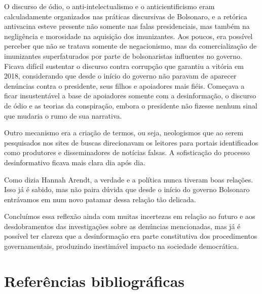 O discurso de ódio, o anti-intelectualismo e o anticientificismo eram
calculadamente organizados nas práticas discursivas de Bolsonaro, e a
retórica antivacina esteve presente não somente nas falas presidenciais,
mas também na negligência e morosidade na aquisição dos imunizantes. Aos
poucos, era possível perceber que não se tratava somente de
negacionismo, mas da comercialização de imunizantes superfaturados por
parte de bolsonaristas influentes no governo. Ficava difícil sustentar o
discurso contra corrupção que garantiu a vitória em 2018, considerando
que desde o início do governo não paravam de aparecer denúncias contra o
presidente, seus filhos e apoiadores mais fiéis. Começava a ficar
insustentável a base de apoiadores somente com a desinformação, o
discurso de ódio e as teorias da conspiração, embora o presidente não
fizesse nenhum sinal que mudaria o rumo de sua narrativa.

Outro mecanismo era a criação de termos, ou seja, neologismos que ao
serem pesquisados nos sites de buscas direcionavam os leitores para
portais identificados como produtores e disseminadores de notícias
falsas. A sofisticação do processo desinformativo ficava mais clara dia
após dia.

Como dizia Hannah Arendt, a verdade e a política nunca tiveram boas
relações. Isso já é sabido, mas não paira dúvida que desde o início do
governo Bolsonaro entrávamos em num novo patamar dessa relação tão
delicada.

Concluímos essa reflexão ainda com muitas incertezas em relação ao
futuro e aos desdobramentos das investigações sobre as denúncias
mencionadas, mas já é possível ter clareza que a desinformação era parte
constitutiva dos procedimentos governamentais, produzindo inestimável
impacto na sociedade democrática.

\chapter{Referências bibliográficas}

